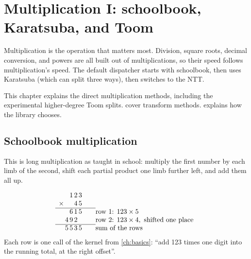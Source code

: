 \chapter{Multiplication I: schoolbook, Karatsuba, and Toom}
\label{ch:mul}

Multiplication is the operation that matters most. Division, square roots, decimal
conversion, and powers are all built out of multiplications, so their speed follows
multiplication's speed. The default dispatcher starts with schoolbook, then uses
Karatsuba (which can split three ways), then switches to the NTT.

\begin{center}
\end{center}

This chapter explains the direct multiplication methods, including the
experimental higher-degree Toom splits.  cover transform methods.
 explains how the library chooses.

\section{Schoolbook multiplication}
\label{sec:schoolbook}

This is long multiplication as taught in school: multiply the first number by each limb
of the second, shift each partial product one limb further left, and add them all up.

\begin{example}
\[
\begin{array}{c@{\,}c@{\,}c@{\,}c@{\,}c@{\qquad}l}
 & & 1 & 2 & 3 & \\
\times & & & 4 & 5 & \\ \cline{1-5}
 & & 6 & 1 & 5 & \text{row 1: } 123 \times 5 \\
 & 4 & 9 & 2 & & \text{row 2: } 123 \times 4, \text{ shifted one place} \\ \cline{1-5}
 & 5 & 5 & 3 & 5 & \text{sum of the rows}
\end{array}
\]
Each row is one call of the  kernel from \cref{ch:basics}: ``add 123 times
one digit into the running total, at the right offset''.
\end{example}

